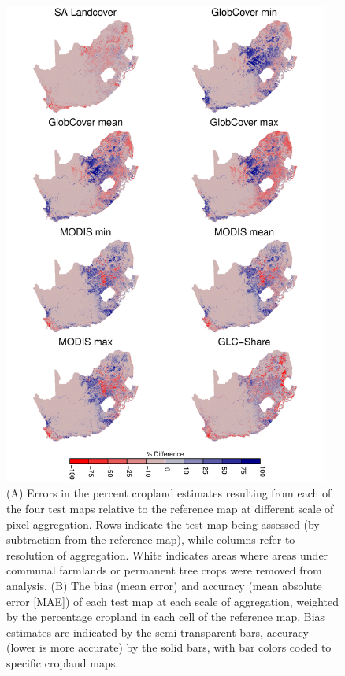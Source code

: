 \documentclass{pnastwo}
\begin{document}
\begin{article}
\begin{figure}[hb]
\centerline{\includegraphics[width=0.95\textwidth]{figures/figure1.pdf}}
\vspace{-0.15 cm}
\caption{(A) Errors in the percent cropland estimates resulting from each of the four test maps relative to the reference map at different scale of pixel aggregation. Rows indicate the test map being assessed (by subtraction from the reference map), while columns refer to resolution of aggregation. White indicates areas where areas under communal farmlands or permanent tree crops were removed from analysis. (B) The bias (mean error) and accuracy (mean absolute error [MAE]) of each test map at each scale of aggregation, weighted by the percentage cropland in each cell of the reference map. Bias estimates are indicated by the semi-transparent bars, accuracy (lower is more accurate) by the solid bars, with bar colors coded to specific cropland maps.}
\label{afoto1}
\end{figure}


\end{article}
\end{document}
